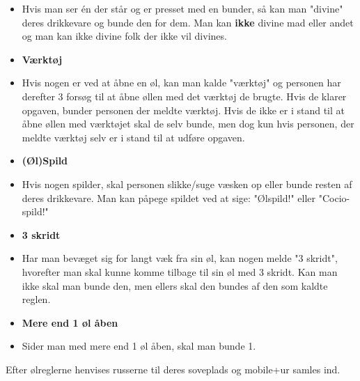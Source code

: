 \begin{itemize}
\item[] Hvis man ser én der står og er presset med en bunder, så kan man "divine" deres drikkevare og bunde den for dem. Man kan \textbf{ikke} divine mad eller andet og man kan ikke divine folk der ikke vil divines.
\item \textbf{Værktøj}
\item[] Hvis nogen er ved at åbne en øl, kan man kalde "værktøj" og personen har derefter 3 forsøg til at åbne øllen med det værktøj de brugte. Hvis de klarer opgaven, bunder personen der meldte værktøj. Hvis de ikke er i stand til at åbne øllen med værktøjet skal de selv bunde, men dog kun hvis personen, der meldte værktøj selv er i stand til at udføre opgaven.
\item \textbf{(Øl)Spild}
\item[] Hvis nogen spilder, skal personen slikke/suge væsken op eller bunde resten af deres drikkevare. Man kan påpege spildet ved at sige: "Ølspild!" eller "Cocio-spild!"\\

\item \textbf{3 skridt}
\item[] Har man bevæget sig for langt væk fra sin øl, kan nogen melde "3 skridt", hvorefter man skal kunne komme tilbage til sin øl med 3 skridt. Kan man ikke skal man bunde den, men ellers skal den bundes af den som kaldte reglen.
\item \textbf{Mere end 1 øl åben}
  \item[] Sider man med mere end 1 øl åben, skal man bunde 1.
\end{itemize}

Efter ølreglerne henvises russerne til deres soveplads og mobile+ur samles ind.